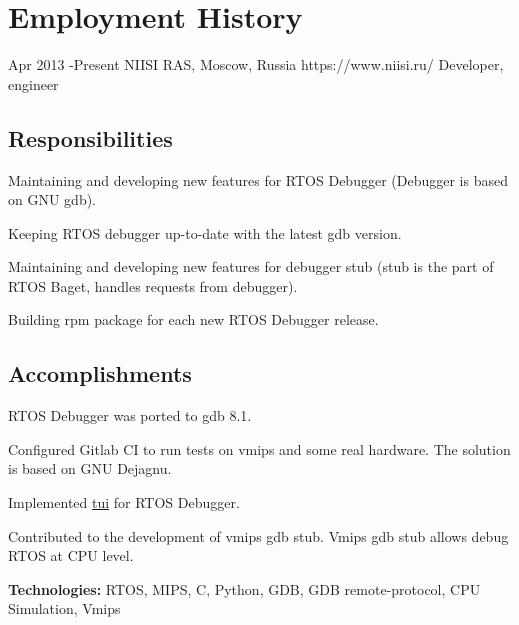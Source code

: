 \documentclass[10pt]{article} %
\begin{document}
\section{Employment History}
\job
{Apr 2013 -}{Present}
{NIISI RAS, Moscow, Russia}
{https://www.niisi.ru/}
{Developer, engineer}
{



\begin{itemize-noindent}
\subsection{Responsibilities}
\item{Maintaining and developing new features for RTOS Debugger (Debugger is based on GNU gdb).}
\item{Keeping RTOS debugger up-to-date with the latest gdb version.}
\item{Maintaining and developing new features for debugger stub (stub is the part of RTOS Baget, handles requests from debugger).}
\item{Building rpm package for each new RTOS Debugger release.}

\subsection{Accomplishments}
\item{RTOS Debugger was ported to gdb 8.1.}
\item{Configured Gitlab CI to run tests on vmips and some real hardware. The solution is based on GNU Dejagnu.}
\item{Implemented \href{https://github.com/dzabraev/mcgdb}{tui} for RTOS Debugger.}
\item{Contributed to the development of vmips gdb stub. Vmips gdb stub allows debug RTOS at CPU level.}
\end{itemize-noindent}

\rule{0mm}{5mm}\textbf{Technologies:} RTOS, MIPS, C, Python, GDB, GDB remote-protocol, CPU Simulation, Vmips}
\end{document}
